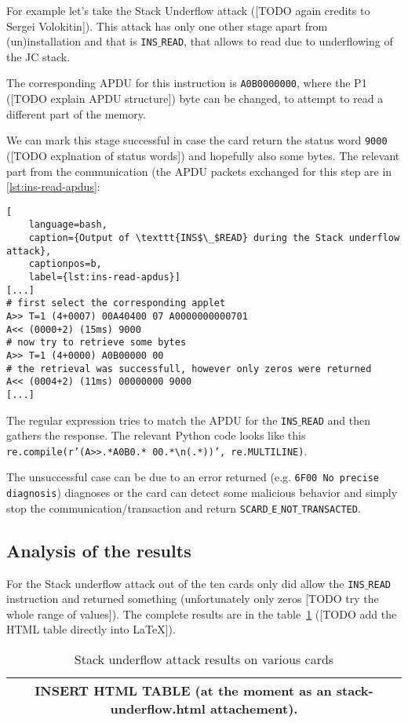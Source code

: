 \documentclass[a4paper]{scrartcl}
\begin{document}
For example let's take the Stack Underflow attack ([TODO again credits to Sergei Volokitin]). This attack has only one other stage apart from (un)installation and that is \texttt{INS$\_$READ}, that allows to read due to underflowing of the JC stack.

The corresponding APDU for this instruction is \texttt{A0B0000000}, where the P1 ([TODO explain APDU structure]) byte can be changed, to attempt to read a different part of the memory.

We can mark this stage successful in case the card return the status word \texttt{9000} ([TODO explnation of status words]) and hopefully also some bytes. The relevant part from the communication (the APDU packets exchanged for this step are in \ref{lst:ins-read-apdus}:

\begin{lstlisting}[
    language=bash,
    caption={Output of \texttt{INS$\_$READ} during the Stack underflow attack},
    captionpos=b,
    label={lst:ins-read-apdus}]
[...]
# first select the corresponding applet
A>> T=1 (4+0007) 00A40400 07 A0000000000701
A<< (0000+2) (15ms) 9000
# now try to retrieve some bytes
A>> T=1 (4+0000) A0B00000 00
# the retrieval was successfull, however only zeros were returned
A<< (0004+2) (11ms) 00000000 9000
[...]
\end{lstlisting}

The regular expression tries to match the APDU for the \texttt{INS$\_$READ} and then gathers the response. The relevant Python code looks like this \texttt{re.compile(r'(A>>.*A0B0.* 00.*{\textbackslash}n(.*))', re.MULTILINE)}.

The unsuccessful case can be due to an error returned (e.g. \texttt{6F00 No precise diagnosis}) diagnoses or the card can detect some malicious behavior and simply stop the communication/transaction and return \texttt{SCARD$\_$E$\_$NOT$\_$TRANSACTED}.


\subsection{Analysis of the results}

For the Stack underflow attack out of the ten cards only did allow the \texttt{INS$\_$READ} instruction and returned something (unfortunately only zeros [TODO try the whole range of values]). The complete results are in the table~\ref{tbl:stack-underflow} ([TODO add the HTML table directly into \LaTeX]).

\begin{table}[h!]
    \centering
    \begin{tabular}{|c|}
        \hline
            INSERT HTML TABLE (at the moment as an stack-underflow.html attachement).\\
        \hline
    \end{tabular}
    \label{tbl:stack-underflow}
    \caption{Stack underflow attack results on various cards}
\end{table}
\end{document}
